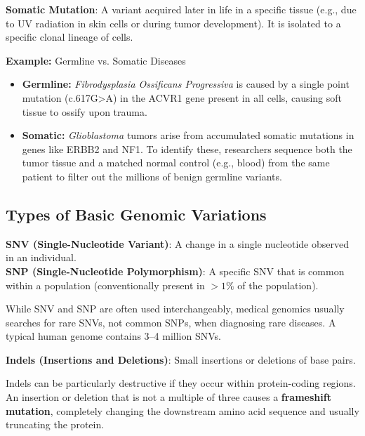 \documentclass[11pt,a4paper]{article}
\begin{document}
\begin{important}
    \textbf{Somatic Mutation}: A variant acquired later in life in a specific tissue (e.g., due to UV radiation in skin cells or during tumor development). It is isolated to a specific clonal lineage of cells.
\end{important}

\textbf{Example:} Germline vs. Somatic Diseases
\begin{itemize}
    \item \textbf{Germline:} \textit{Fibrodysplasia Ossificans Progressiva} is caused by a single point mutation (c.617G>A) in the ACVR1 gene present in all cells, causing soft tissue to ossify upon trauma.
    \item \textbf{Somatic:} \textit{Glioblastoma} tumors arise from accumulated somatic mutations in genes like ERBB2 and NF1. To identify these, researchers sequence both the tumor tissue and a matched normal control (e.g., blood) from the same patient to filter out the millions of benign germline variants.
\end{itemize}

\subsection{Types of Basic Genomic Variations}
\begin{important}
    \textbf{SNV (Single-Nucleotide Variant)}: A change in a single nucleotide observed in an individual. 
    \\
    \textbf{SNP (Single-Nucleotide Polymorphism)}: A specific SNV that is common within a population (conventionally present in $>1\%$ of the population).
\end{important}

While SNV and SNP are often used interchangeably, medical genomics usually searches for rare SNVs, not common SNPs, when diagnosing rare diseases. A typical human genome contains 3–4 million SNVs.

\begin{important}
    \textbf{Indels (Insertions and Deletions)}: Small insertions or deletions of base pairs. 
\end{important}

Indels can be particularly destructive if they occur within protein-coding regions. An insertion or deletion that is not a multiple of three causes a \textbf{frameshift mutation}, completely changing the downstream amino acid sequence and usually truncating the protein.
\end{document}
